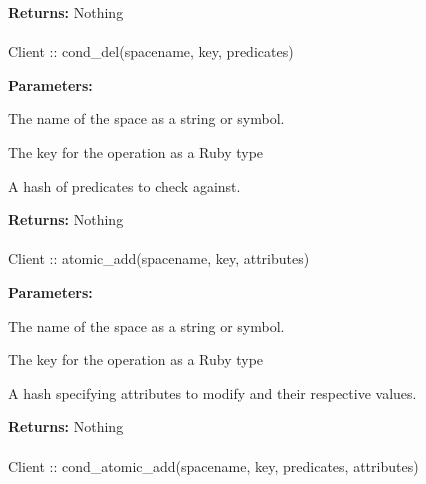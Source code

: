 \noindent\textbf{Returns:}
Nothing

\paragraph{}
\begin{ccode}
Client :: cond_del(spacename, key, predicates)
\end{ccode}
\funcdesc 

\noindent\textbf{Parameters:}
\begin{description}[labelindent=\widthof{{predicates}},leftmargin=*,noitemsep,nolistsep,align=right]
\item[spacename] The name of the space as a string or symbol.
\item[key] The key for the operation as a Ruby type
\item[predicates] A hash of predicates to check against.
\end{description}

\noindent\textbf{Returns:}
Nothing

\paragraph{}
\begin{ccode}
Client :: atomic_add(spacename, key, attributes)
\end{ccode}
\funcdesc 

\noindent\textbf{Parameters:}
\begin{description}[labelindent=\widthof{{attributes}},leftmargin=*,noitemsep,nolistsep,align=right]
\item[spacename] The name of the space as a string or symbol.
\item[key] The key for the operation as a Ruby type
\item[attributes] A hash specifying attributes to modify and their respective values.
\end{description}

\noindent\textbf{Returns:}
Nothing

\paragraph{}
\begin{ccode}
Client :: cond_atomic_add(spacename, key, predicates, attributes)
\end{ccode}
\funcdesc 

